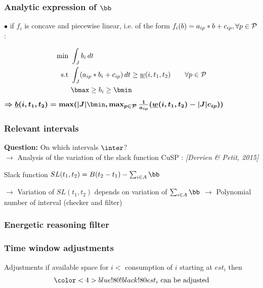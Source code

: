 \begin{frame}
  \frametitle{Analytic expression of $\bb$}
  \vfill
  $\bullet$  if $f_i$ is concave and piecewise linear, i.e. of the form
  $f_i(b)=a_{ip}*b+c_{ip}, \forall p \in {\cal P}$:

    \begin{align*}
      \text{min }  & \int_{J} b_i\,dt  \\
      \text{s.t } & \int_{J}(a_{ip}*b_i+c_{ip})\,dt \ge
                    \underline{w}(i,t_1,t_2) \qquad \forall p \in
                    {\cal P}\\
                   & \bmax \ge b_i \ge \bmin
    \end{align*}
  { \color{blue!80!black!80}
    $\boldmath{\Rightarrow  \underline{b}(i,t_1,t_2)= \max ( |J|\bmin, \max_{p
        \in {\cal P}} \frac{1}{a_{ip}}( \underline{w}(i,t_1,t_2)-|J|c_{ip}))}$}
  \vfill
\end{frame}


\begin{frame}
  \frametitle{Relevant intervals}
  {\bf Question: } On which intervals $\inter$?\\
  \vfill
  $\rightarrow$ Analysis of the variation of the slack function
   {\small CuSP : \it \color{gray!50!black!50} [Derrien \& Petit, 2015]}\\
  \vfill
  \begin{block}{Slack function}
    \centering $SL(t_1,t_2)=B(t_2-t_1) - \sum_{i \in A} \bb$
  \end{block}
  \vspace{0.8cm}
  $\rightarrow$ Variation of $SL(t_1,t_2)$ depends on variation of 
  $\sum_{i \in A} \bb$
  \vfill 
  $\rightarrow$ Polynomial number of interval (checker and filter)
  \vfill 
\end{frame}

\subsubsection{Energetic reasoning filter}

\begin{frame}
  \frametitle{Time window adjustments}
  \vspace{0.4cm}
  \begin{center}
    
  \end{center}
  \vfill
  \begin{block}{Adjustments}
    if { available space for $i$}$<${\color<2-3>{blue!80!black!80} consumption of $i$ starting at $est_i$}  then
    \[\color<4>{blue!80!black!80}est_i \text{ can be adjusted}\]
  \end{block}
  \vfill
\end{frame}

